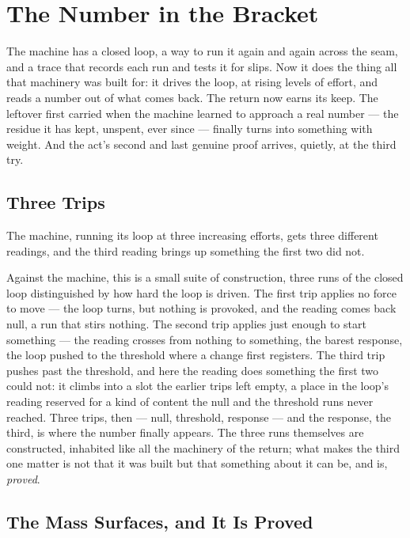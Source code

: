 \chapter{The Number in the Bracket}

The machine has a closed loop, a way to run it again and again across the seam, and a trace that records each run
and tests it for slips. Now it does the thing all that machinery was built for: it drives the loop, at rising
levels of effort, and reads a number out of what comes back. The return now earns its keep. The leftover first
carried when the machine learned to approach a real number --- the residue it has kept, unspent, ever since ---
finally turns into something with weight. And the act's second and last genuine proof arrives, quietly, at the
third try.

\section{Three Trips}

The machine, running its loop at three increasing efforts, gets three different readings, and the third reading
brings up something the first two did not.

Against the machine, this is a small suite of construction, three runs of the closed loop distinguished by how
hard the loop is driven. The first trip applies no force to move --- the loop turns, but nothing is provoked, and
the reading comes back null, a run that stirs nothing. The second trip applies just enough to start something ---
the reading crosses from nothing to something, the barest response, the loop pushed to the threshold where a
change first registers. The third trip pushes past the threshold, and here the reading does something the first
two could not: it climbs into a slot the earlier trips left empty, a place in the loop's reading reserved for a
kind of content the null and the threshold runs never reached. Three trips, then --- null, threshold, response ---
and the response, the third, is where the number finally appears. The three runs themselves
are constructed, inhabited like all the machinery of the return; what makes the third one matter is not that it
was built but that something about it can be, and is, \emph{proved}.

\section{The Mass Surfaces, and It Is Proved}

